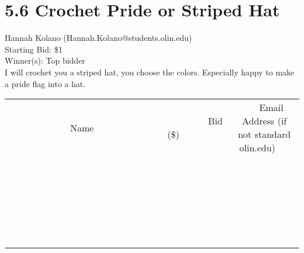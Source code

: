 \documentclass[11pt]{article}
\begin{document}
\section*{5.6 Crochet Pride or Striped Hat}
Hannah Kolano (Hannah.Kolano@students.olin.edu) \\
Starting Bid: \$1 \\
Winner(s): 
Top bidder \\
I will crochet you a striped hat, you choose the colors. Especially happy to make a pride flag into a hat. \\[6ex]
\begin{tabular}{c c c}
~~~~~~~~~~~~~Name~~~~~~~~~~~~~ & ~~~~~~~~~Bid (\$)~~~~~~~~~ & ~~~Email Address (if not standard olin.edu)~~~ \\
 & & \\
\hline
 & & \\
\hline
 & & \\
\hline
 & & \\
\hline
 & & \\
\hline
 & & \\
\hline
 & & \\
\hline
 & & \\
\hline
 & & \\
\hline
 & & \\
\hline
 & & \\
\hline
 & & \\
\hline
 & & \\
\hline
 & & \\
\hline
 & & \\
\hline
 & & \\
\hline
 & & \\
\hline
 & & \\
\hline
 & & \\
\hline
 & & \\
\hline
 & & \\
\hline
 & & \\
\hline
 & & \\
\hline
 & & \\
\hline
 & & \\
\hline
 & & \\
\hline
\end{tabular}
\clearpage
\end{document}

